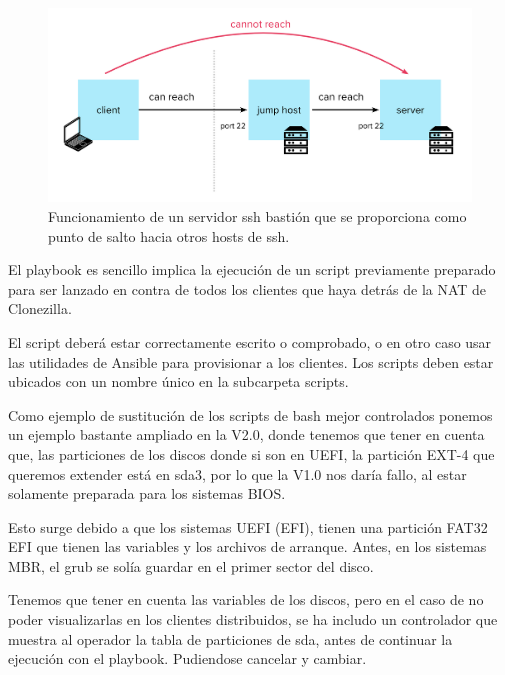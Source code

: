 \begin{figure}[H]
	\centering
	\includegraphics[scale=0.10]{update-clients/bastion.png}
	\caption{Funcionamiento de un servidor ssh bastión que se proporciona como punto de salto hacia otros hosts de ssh.}
\end{figure}

El playbook es sencillo implica la ejecución de un script previamente preparado para ser lanzado en contra de todos los clientes que haya detrás de la NAT de Clonezilla.



El script deberá estar correctamente escrito o comprobado, o en otro caso usar las utilidades de Ansible para provisionar a los clientes. Los scripts deben estar ubicados 
con un nombre único en la subcarpeta scripts.

\newpage
Como ejemplo de sustitución de los scripts de bash mejor controlados ponemos un ejemplo bastante ampliado en la V2.0, donde tenemos que tener en cuenta que,
las particiones de los discos donde si son en UEFI, la partición EXT-4 que queremos extender está en sda3, por lo que la V1.0 nos daría fallo, al 
estar solamente preparada para los sistemas BIOS.

Esto surge debido a que los sistemas UEFI (EFI), tienen una partición FAT32 EFI que tienen las variables y los archivos de arranque. Antes, en los sistemas MBR,
el grub se solía guardar en el primer sector del disco.

Tenemos que tener en cuenta las variables de los discos, pero en el caso de no poder visualizarlas en los clientes distribuidos, se ha includo un controlador que muestra
al operador la tabla de particiones de sda, antes de continuar la ejecución con el playbook. Pudiendose cancelar y cambiar.



